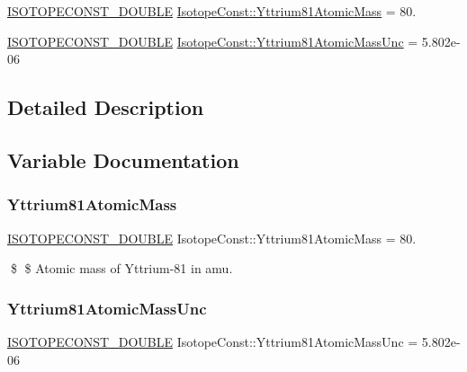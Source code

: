 \begin{DoxyCompactItemize}
\item 
\mbox{\hyperlink{group___isotope_const-_macros_ga8f45a7272ce02c0b4c65c44636ed719a}{I\+S\+O\+T\+O\+P\+E\+C\+O\+N\+S\+T\+\_\+\+D\+O\+U\+B\+LE}} \mbox{\hyperlink{group___isotope_const-_yttrium-_y81_ga9980b446fb3211e12612929214150b24}{Isotope\+Const\+::\+Yttrium81\+Atomic\+Mass}} = 80.
\item 
\mbox{\hyperlink{group___isotope_const-_macros_ga8f45a7272ce02c0b4c65c44636ed719a}{I\+S\+O\+T\+O\+P\+E\+C\+O\+N\+S\+T\+\_\+\+D\+O\+U\+B\+LE}} \mbox{\hyperlink{group___isotope_const-_yttrium-_y81_ga54ffee95b8b00dbff739efcd06c1e102}{Isotope\+Const\+::\+Yttrium81\+Atomic\+Mass\+Unc}} = 5.\+802e-\/06
\end{DoxyCompactItemize}


\subsection{Detailed Description}


\subsection{Variable Documentation}
\mbox{\label{group___isotope_const-_yttrium-_y81_ga9980b446fb3211e12612929214150b24}} 
\subsubsection{\texorpdfstring{Yttrium81\+Atomic\+Mass}{Yttrium81AtomicMass}}
{\footnotesize\ttfamily \mbox{\hyperlink{group___isotope_const-_macros_ga8f45a7272ce02c0b4c65c44636ed719a}{I\+S\+O\+T\+O\+P\+E\+C\+O\+N\+S\+T\+\_\+\+D\+O\+U\+B\+LE}} Isotope\+Const\+::\+Yttrium81\+Atomic\+Mass = 80.}

\$ \$ Atomic mass of Yttrium-\/81 in amu. \mbox{\label{group___isotope_const-_yttrium-_y81_ga54ffee95b8b00dbff739efcd06c1e102}} 
\subsubsection{\texorpdfstring{Yttrium81\+Atomic\+Mass\+Unc}{Yttrium81AtomicMassUnc}}
{\footnotesize\ttfamily \mbox{\hyperlink{group___isotope_const-_macros_ga8f45a7272ce02c0b4c65c44636ed719a}{I\+S\+O\+T\+O\+P\+E\+C\+O\+N\+S\+T\+\_\+\+D\+O\+U\+B\+LE}} Isotope\+Const\+::\+Yttrium81\+Atomic\+Mass\+Unc = 5.\+802e-\/06}

